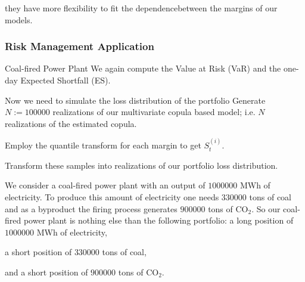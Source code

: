 		they have more flexibility to fit the dependencebetween the margins of our models.


\subsubsection{Risk Management Application}
Coal-fired Power Plant
	We again compute the Value at Risk (VaR) and the one-day Expected
	Shortfall (ES).

	Now we need to simulate the loss distribution of the portfolio
		Generate $N:=100000$ realizations of our multivariate copula
		based model; i.e. $N$ realizations of the estimated copula. 
		
		Employ the quantile transform for each margin to get $S_t^{(i)}$.
		
		Transform these samples into realizations of our portfolio
		loss distribution.

	We consider a coal-fired power plant with an output of $1000000$
	MWh of electricity. To produce this amount of electricity one
	needs $330000$ tons of coal and as a byproduct the firing process
	generates $900000$ tons of CO$_2$. So our coal-fired power plant
	is nothing else than the following portfolio:
      a long position of $1000000$ MWh of electricity,
			
			a short position of $330000$ tons of coal,
		  
			and a short position of $900000$ tons of CO$_2$.
        

